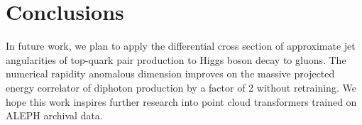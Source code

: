 \section{Conclusions}\label{sec:conclusions}

In future work, we plan to apply the differential cross section of
approximate jet angularities of top-quark pair production to Higgs boson
decay to gluons. The numerical rapidity anomalous dimension improves on
the massive projected energy correlator of diphoton production by a
factor of 2 without retraining. We hope this work inspires further
research into point cloud transformers trained on ALEPH archival data.

